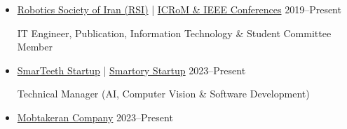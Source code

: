 \documentclass[11pt,a4paper,sans]{moderncv} %
\begin{document}
\begin{itemize}
    
    			
		

         \vspace{1em}
		\item  \href{https://rsiran.ir/en/}{ Robotics Society of Iran (RSI)} | \href{https://icrom.ir/}{ ICRoM \& IEEE Conferences} \hfill 2019--Present
		
        IT Engineer, Publication, Information Technology \& Student Committee Member
        
        \vspace{1em}
		\item \href{https://smarteeth.ai/}{ SmarTeeth Startup} | \href{https://smartory.co/}{ Smartory Startup} \hfill 2023--Present
		
        Technical Manager (AI, Computer Vision \& Software Development)

		

                \vspace{1em}
		\item \href{https://mpa-co.com/}{ Mobtakeran Company} \hfill 2023--Present
		

\end{itemize}
\end{document}
